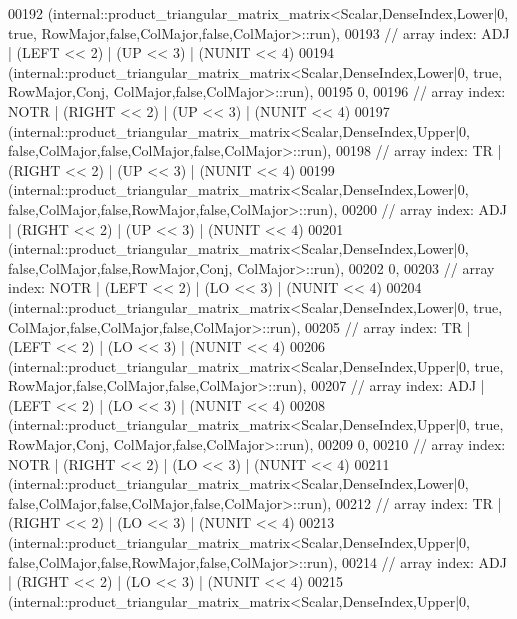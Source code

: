 \begin{DoxyCode}
00192     (internal::product\_triangular\_matrix\_matrix<Scalar,DenseIndex,Lower|0,          true,
       RowMajor,false,ColMajor,false,ColMajor>::run),
00193     \textcolor{comment}{// array index: ADJ   | (LEFT  << 2) | (UP << 3) | (NUNIT << 4)}
00194     (internal::product\_triangular\_matrix\_matrix<Scalar,DenseIndex,Lower|0,          true, RowMajor,Conj,
       ColMajor,false,ColMajor>::run),
00195     0,
00196     \textcolor{comment}{// array index: NOTR  | (RIGHT << 2) | (UP << 3) | (NUNIT << 4)}
00197     (internal::product\_triangular\_matrix\_matrix<Scalar,DenseIndex,Upper|0,         
       false,ColMajor,false,ColMajor,false,ColMajor>::run),
00198     \textcolor{comment}{// array index: TR    | (RIGHT << 2) | (UP << 3) | (NUNIT << 4)}
00199     (internal::product\_triangular\_matrix\_matrix<Scalar,DenseIndex,Lower|0,         
       false,ColMajor,false,RowMajor,false,ColMajor>::run),
00200     \textcolor{comment}{// array index: ADJ   | (RIGHT << 2) | (UP << 3) | (NUNIT << 4)}
00201     (internal::product\_triangular\_matrix\_matrix<Scalar,DenseIndex,Lower|0,         
       false,ColMajor,false,RowMajor,Conj, ColMajor>::run),
00202     0,
00203     \textcolor{comment}{// array index: NOTR  | (LEFT  << 2) | (LO << 3) | (NUNIT << 4)}
00204     (internal::product\_triangular\_matrix\_matrix<Scalar,DenseIndex,Lower|0,          true,
       ColMajor,false,ColMajor,false,ColMajor>::run),
00205     \textcolor{comment}{// array index: TR    | (LEFT  << 2) | (LO << 3) | (NUNIT << 4)}
00206     (internal::product\_triangular\_matrix\_matrix<Scalar,DenseIndex,Upper|0,          true,
       RowMajor,false,ColMajor,false,ColMajor>::run),
00207     \textcolor{comment}{// array index: ADJ   | (LEFT  << 2) | (LO << 3) | (NUNIT << 4)}
00208     (internal::product\_triangular\_matrix\_matrix<Scalar,DenseIndex,Upper|0,          true, RowMajor,Conj,
       ColMajor,false,ColMajor>::run),
00209     0,
00210     \textcolor{comment}{// array index: NOTR  | (RIGHT << 2) | (LO << 3) | (NUNIT << 4)}
00211     (internal::product\_triangular\_matrix\_matrix<Scalar,DenseIndex,Lower|0,         
       false,ColMajor,false,ColMajor,false,ColMajor>::run),
00212     \textcolor{comment}{// array index: TR    | (RIGHT << 2) | (LO << 3) | (NUNIT << 4)}
00213     (internal::product\_triangular\_matrix\_matrix<Scalar,DenseIndex,Upper|0,         
       false,ColMajor,false,RowMajor,false,ColMajor>::run),
00214     \textcolor{comment}{// array index: ADJ   | (RIGHT << 2) | (LO << 3) | (NUNIT << 4)}
00215     (internal::product\_triangular\_matrix\_matrix<Scalar,DenseIndex,Upper|0,         

\end{DoxyCode}
